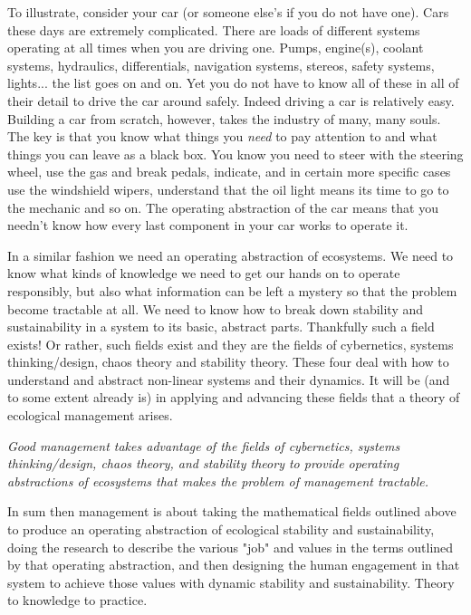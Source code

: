\documentclass[11pt,a5paper]{book}
\begin{document}
To illustrate, consider your car (or someone else's if you do not have one). Cars these days are extremely complicated. There are loads of different systems operating at all times when you are driving one. Pumps, engine(s), coolant systems, hydraulics, differentials, navigation systems, stereos, safety systems, lights... the list goes on and on. Yet you do not have to know all of these in all of their detail to drive the car around safely. Indeed driving a car is relatively easy. Building a car from scratch, however, takes the industry of many, many souls. The key is that you know what things you \textit{need} to pay attention to and what things you can leave as a black box. You know you need to steer with the steering wheel, use the gas and break pedals, indicate, and in certain more specific cases use the windshield wipers, understand that the oil light means its time to go to the mechanic and so on. The operating abstraction of the car means that you needn't know how every last component in your car works to operate it. 

In a similar fashion we need an operating abstraction of ecosystems. We need to know what kinds of knowledge we need to get our hands on to operate responsibly, but also what information can be left a mystery so that the problem become tractable at all. We need to know how to break down stability and sustainability in a system to its basic, abstract parts. Thankfully such a field exists! Or rather, such fields exist and they are the fields of cybernetics, systems thinking/design, chaos theory and stability theory. These four deal with how to understand and abstract non-linear systems and their dynamics. It will be (and to some extent already is) in applying and advancing these fields that a theory of ecological management arises. \newline

\textit{Good management takes advantage of the fields of cybernetics, systems thinking/design, chaos theory, and stability theory to provide operating abstractions of ecosystems that makes the problem of management tractable.}\newline

In sum then management is about taking the mathematical fields outlined above to produce an operating abstraction of ecological stability and sustainability, doing the research to describe the various "job" and values in the terms outlined by that operating abstraction, and then designing the human engagement in that system to achieve those values with dynamic stability and sustainability. Theory to knowledge to practice. 







\end{document}
